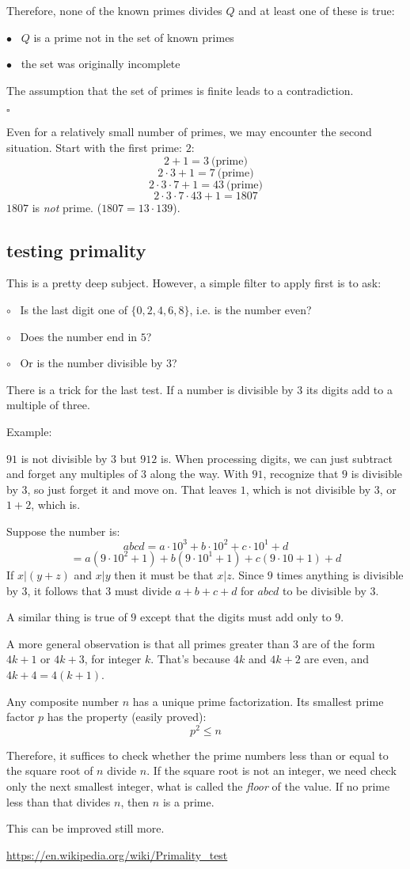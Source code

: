 \documentclass[11pt, oneside]{article}
\begin{document}
Therefore, none of the known primes divides $Q$ and at least one of these is true:

$\bullet$ \  $Q$ is a prime not in the set of known primes

$\bullet$ \ the set was originally incomplete

The assumption that the set of primes is finite leads to a contradiction.

$\square$

Even for a relatively small number of primes, we may encounter the second situation.  Start with the first prime:  $2$:
\[ 2 + 1 = 3 \ \text{(prime)} \]
\[ 2 \cdot 3 + 1 = 7 \ \text{(prime)}  \]
\[ 2 \cdot 3 \cdot 7 +1 = 43 \ \text{(prime)}  \]
\[ 2 \cdot 3 \cdot 7 \cdot 43 + 1 =  1807 \]
$1807$ is \emph{not} prime.  ($1807 = 13 \cdot 139$).

\subsection*{testing primality}
This is a pretty deep subject.  However, a simple filter to apply first is to ask:  

$\circ$ \ Is the last digit one of $\{ 0,2,4,6,8 \}$, i.e. is the number even?  

$\circ$ \ Does the number end in $5$?  

$\circ$ \ Or is the number divisible by $3$?

There is a trick for the last test.  If a number is divisible by $3$ its digits add to a multiple of three.

Example:

$91$ is not divisible by $3$ but $912$ is.  When processing digits, we can just subtract and forget any multiples of $3$ along the way.  With $91$, recognize that $9$ is divisible by $3$, so just forget it and move on.  That leaves $1$, which is not divisible by $3$, or $1 + 2$, which is.

Suppose the number is:
\[ abcd = a \cdot 10^3 + b \cdot 10^2 + c \cdot 10^1 + d \]
\[ = a (9 \cdot 10^2 + 1) + b (9 \cdot 10^1 + 1) + c (9 \cdot 10 + 1) + d \]
If $x|(y+z)$ and $x|y$ then it must be that $x|z$.  Since $9$ times anything is divisible by $3$, it follows that $3$ must divide $a + b + c + d$ for $abcd$ to be divisible by $3$.

A similar thing is true of $9$ except that the digits must add only to $9$.

A more general observation is that all primes greater than $3$ are of the form $4k + 1$ or $4k + 3$, for integer $k$.  That's because $4k$ and $4k + 2$ are even, and $4k + 4 = 4(k + 1)$.

Any composite number $n$ has a unique prime factorization.  Its smallest prime factor $p$ has the property (easily proved):
\[ p^2 \le n \]

Therefore, it suffices to check whether the prime numbers less than or equal to the square root of $n$ divide $n$.  If the square root is not an integer, we need check only the next smallest integer, what is called the \emph{floor} of the value.  If no prime less than that divides $n$, then $n$ is a prime.

This can be improved still more.

\url{https://en.wikipedia.org/wiki/Primality_test}
\end{document}
